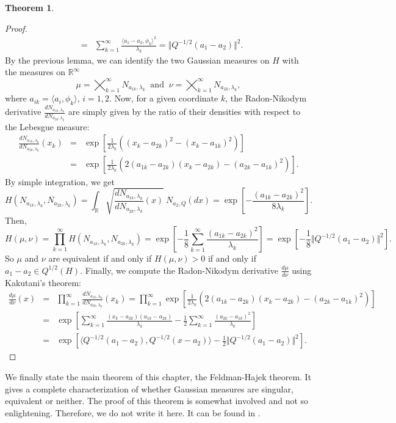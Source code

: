 \documentclass[10pt, a4paper]{report}
\newcommand{\R}[0]{\mathbb{R}}
\theoremstyle{definition}
\newtheorem{theorem}{Theorem}
\theoremstyle{remark}
\begin{document}
\begin{theorem}
\begin{proof}
\begin{eqnarray*}
			& = & \sum_{k=1}^{\infty} \frac{\langle a_1-a_2,\phi_k\rangle^2}{\lambda_k} = \Vert Q^{-1/2}(a_1-a_2)\Vert^2.
		\end{eqnarray*}
		By the previous lemma, we can identify the two Gaussian measures on $H$ with the measures on $\R^\infty$
		$$\mu = \bigtimes_{k=1}^\infty N_{a_{1k},\lambda_k} \ \text{ and } \ \nu = \bigtimes_{k=1}^\infty N_{a_{2k},\lambda_k},$$
		where $a_{ik} = \langle a_i,\phi_k\rangle$, $i=1,2$.
		Now, for a given coordinate $k$, the Radon-Nikodym derivative $\frac{dN_{a_{1k},\lambda_k}}{dN_{a_{2k},\lambda_k}}$ are simply given by the ratio of their densities with respect to the Lebesgue measure:
		\begin{eqnarray*}
			\frac{dN_{a_{1k},\lambda_k}}{dN_{a_{2k},\lambda_k}}(x_k) & = & \exp\left[\frac{1}{2\lambda_k}\left((x_k-a_{2k})^2-(x_k-a_{1k})^2\right) \right]\\
			& = & \exp\left[\frac{1}{2\lambda_k}\left(2(a_{1k}-a_{2k})(x_k-a_{2k})-(a_{2k}-a_{1k})^2\right) \right].
		\end{eqnarray*}
		By simple integration, we get
		$$H(N_{a_{1k},\lambda_k},N_{a_{2k},\lambda_k}) = \int_{\R} \sqrt{\frac{dN_{a_{1k},\lambda_k}}{dN_{a_{2k},\lambda_k}}(x)} \ N_{a_2,Q}(dx) = \exp\left[-\frac{(a_{1k}-a_{2k})^2}{8\lambda_k}\right].$$
		Then,
		$$H(\mu,\nu) = \prod_{k=1}^\infty H(N_{a_{1k},\lambda_k},N_{a_{2k},\lambda_k}) = \exp\left[-\frac{1}{8}\sum_{k=1}^{\infty}\frac{(a_{1k}-a_{2k})^2}{\lambda_k} \right] = \exp\left[-\frac{1}{8}\Vert Q^{-1/2}(a_1-a_2) \Vert^2 \right].$$
		So $\mu$ and $\nu$ are equivalent if and only if $H(\mu,\nu)>0$ if and only if $a_1-a_2 \in Q^{1/2}(H)$. Finally, we compute the Radon-Nikodym derivative $\frac{d\mu}{d\nu}$ using Kakutani's theorem:
		\begin{eqnarray*}
			\frac{d\mu}{d\nu}(x) & = & \prod_{k=1}^\infty \frac{dN_{a_{1k},\lambda_k}}{dN_{a_{2k},\lambda_k}}(x_k) = \prod_{k=1}^{\infty} \exp\left[\frac{1}{2\lambda_k}\left(2(a_{1k}-a_{2k})(x_k-a_{2k})-(a_{2k}-a_{1k})^2\right) \right] \\
			& = & \exp\left[\sum_{k=1}^{\infty}\frac{(x_k-a_{2k})(a_{1k}-a_{2k})}{\lambda_k} - \frac{1}{2}\sum_{k=1}^{\infty}\frac{(a_{2k}-a_{1k})^2}{\lambda_k} \right]\\
			& = & \exp\left[\langle Q^{-1/2}(a_1-a_2),Q^{-1/2}(x-a_2)\rangle - \frac{1}{2} \Vert Q^{-1/2}(a_1-a_2)\Vert^2\right].
		\end{eqnarray*}
	\end{proof}
\end{theorem}
We finally state the main theorem of this chapter, the Feldman-Hajek theorem. It gives a complete characterization of whether Gaussian measures are singular, equivalent or neither. The proof of this theorem is somewhat involved and not so enlightening. Therefore, we do not write it here. It can be found in \cite[Theorem 2.25]{prato1}.
\end{document}

